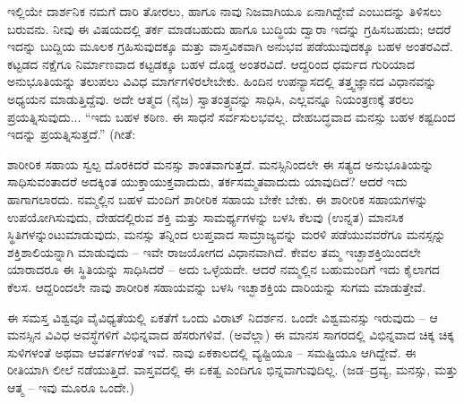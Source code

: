 ಇಲ್ಲಿಯೇ ದಾರ್ಶನಿಕ ನಮಗೆ ದಾರಿ ತೋರಲು, ಹಾಗೂ ನಾವು ನಿಜವಾಗಿಯೂ ಏನಾಗಿದ್ದೇವೆ ಎಂಬುದನ್ನು ತಿಳಿಸಲು ಬರುವನು. ನೀವು ಈ ವಿಷಯದಲ್ಲಿ ತರ್ಕ ಮಾಡಬಹುದು ಹಾಗೂ ಬುದ್ಧಿಯ ದ್ವಾರಾ ಇದನ್ನು ಗ್ರಹಿಸಬಹುದು; ಆದರೆ ಇದನ್ನು ಬುದ್ದಿಯ ಮೂಲಕ ಗ್ರಹಿಸುವುದಕ್ಕೂ ಮತ್ತು ವಾಸ್ತವಿಕವಾಗಿ ಅನುಭವ ಪಡೆಯುವುದಕ್ಕೂ ಬಹಳ ಅಂತರವಿದೆ. ಕಟ್ಟಡದ ನಕ್ಷೆಗೂ ನಿರ್ಮಾಣವಾದ ಕಟ್ಟಡಕ್ಕೂ ಬಹಳ ದೊಡ್ಡ ಅಂತರವಿದೆ. ಆದ್ದರಿಂದ ಧರ್ಮದ ಗುರಿಯಾದ ಅನುಭೂತಿಯನ್ನು ತಲುಪಲು ವಿವಿಧ ಮಾರ್ಗಗಳಿರಲೇಬೇಕು. ಹಿಂದಿನ ಉಪನ್ಯಾಸದಲ್ಲಿ ತತ್ತ್ವಜ್ಞಾನದ ವಿಧಾನವನ್ನು ಅಧ್ಯಯನ ಮಾಡುತ್ತಿದ್ದೆವು. ಅದೇ ಆತ್ಮದ (ನೈಜ) ಸ್ವಾತಂತ್ರ್ಯವನ್ನು ಸಾಧಿಸಿ, ಎಲ್ಲವನ್ನೂ ನಿಯಂತ್ರಣಕ್ಕೆ ತರಲು ಪ್ರಯತ್ನಿಸುವುದು... “ಇದು ಬಹಳ ಕಠಿಣ. ಈ ಸಾಧನೆ ಸರ್ವಸುಲಭವಲ್ಲ. ದೇಹಬದ್ಧವಾದ ಮನಸ್ಸು ಬಹಳ ಕಷ್ಟದಿಂದ ಇದನ್ನು ಪ್ರಯತ್ನಿಸುತ್ತದೆ.” (ಗೀತೆ: 

\vskip 1.5pt

ಶಾರೀರಿಕ ಸಹಾಯ ಸ್ವಲ್ಪ ದೊರಕಿದರೆ ಮನಸ್ಸು ಶಾಂತವಾಗುತ್ತದೆ. ಮನಸ್ಸಿನಿಂದಲೇ ಈ ಸತ್ಯದ ಅನುಭೂತಿಯನ್ನು ಸಾಧಿಸುವಂತಾದರೆ ಅದಕ್ಕಿಂತ ಯುಕ್ತಾಯುಕ್ತವಾದುದು, ತರ್ಕಸಮ್ಮತವಾದುದು ಯಾವುದಿದೆ? ಆದರೆ ಇದು ಹಾಗಾಗಲಾರದು. ನಮ್ಮಲ್ಲಿನ ಬಹಳ ಮಂದಿಗೆ ಶಾರೀರಿಕ ಸಹಾಯ ಬೇಕೇ ಬೇಕು. ಈ ಶಾರೀರಿಕ ಸಹಾಯಗಳನ್ನು ಉಪಯೋಗಿಸುವುದು, ದೇಹದಲ್ಲಿರುವ ಶಕ್ತಿ ಮತ್ತು ಸಾಮರ್ಥ್ಯಗಳನ್ನು ಬಳಸಿ ಕೆಲವು (ಉನ್ನತ) ಮಾನಸಿಕ ಸ್ಥಿತಿಗಳನ್ನುಂಟುಮಾಡುವುದು, ಮನಸ್ಸು ತನ್ನಿಂದ ಲುಪ್ತವಾದ ಸಾಮ್ರಾಜ್ಯವನ್ನು ಮರಳಿ ಪಡೆಯುವವರೆಗೂ ಮನಸ್ಸನ್ನು ಶಕ್ತಿಶಾಲಿಯನ್ನಾಗಿ ಮಾಡುವುದು – ಇವೇ ರಾಜಯೋಗದ ವಿಧಾನವಾಗಿದೆ. ಕೇವಲ ತಮ್ಮ ಇಚ್ಛಾಶಕ್ತಿಯಿಂದಲೇ ಯಾರಾದರೂ ಈ ಸ್ಥಿತಿಯನ್ನು ಸಾಧಿಸಿದರೆ – ಅದು ಒಳ್ಳೆಯದೇ. ಆದರೆ ನಮ್ಮಲ್ಲಿನ ಬಹುಮಂದಿಗೆ ಇದು ಕೈಲಾಗದ ಕೆಲಸ. ಆದ್ದರಿಂದಲೇ ನಾವು ಶಾರೀರಿಕ ಸಹಾಯವನ್ನು ಬಳಸಿ ಇಚ್ಛಾಶಕ್ತಿಯ ದಾರಿಯನ್ನು ಸುಗಮ ಮಾಡುತ್ತೇವೆ.

\vskip 1.5pt

ಈ ಸಮಸ್ತ ವಿಶ್ವವೂ ವೈವಿಧ್ಯತೆಯಲ್ಲಿ ಏಕತೆಗೆ ಒಂದು ವಿರಾಟ್ ನಿದರ್ಶನ. ಒಂದೇ ವಿಶ್ವಮನಸ್ಸು ಇರುವುದು – ಆ ಮನಸ್ಸಿನ ವಿವಿಧ ಅವಸ್ಥೆಗಳಿಗೆ ವಿಭಿನ್ನವಾದ ಹೆಸರುಗಳಿವೆ. (ಅವೆಲ್ಲಾ) ಈ ಮಾನಸ ಸಾಗರದಲ್ಲಿ ವಿಭಿನ್ನವಾದ ಚಿಕ್ಕ ಚಿಕ್ಕ ಸುಳಿಗಳಂತೆ ಅಥವಾ ಆವರ್ತಗಳಂತೆ ಇವೆ. ನಾವು ಏಕಕಾಲದಲ್ಲಿ ವ್ಯಷ್ಟಿಯೂ – ಸಮಷ್ಟಿಯೂ ಆಗಿದ್ದೇವೆ. ಈ ರೀತಿಯಾಗಿ ಲೀಲೆ ನಡೆಯುತ್ತಿದೆ. ವಾಸ್ತವದಲ್ಲಿ ಈ ಏಕತ್ವ ಎಂದಿಗೂ ಭಿನ್ನವಾಗುವುದಿಲ್ಲ. (ಜಡ–ದ್ರವ್ಯ, ಮನಸ್ಸು, ಮತ್ತು ಆತ್ಮ – ಇವು ಮೂರೂ ಒಂದೇ.)

\vskip 1.5pt

